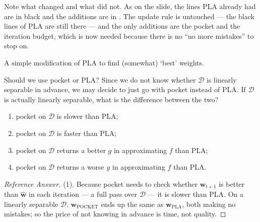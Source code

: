 \begin{algorithm}[H]
    \caption{Pocket Algorithm}\label{alg:pocket}
    \;
    \;
\end{algorithm}

Note what changed and what did not. As on the slide, the lines PLA already
had are in black and the additions are in . The update rule
is untouched --- the black lines of PLA are still there --- and the only
additions are the pocket and the iteration budget, which is now needed because
there is no ``no more mistakes'' to stop on.

\begin{moral}
    A simple modification of PLA to find (somewhat) `best' weights.
\end{moral}

\begin{exercise}
    Should we use pocket or PLA? Since we do not know whether \(\mathcal{D}\) is
    linearly separable in advance, we may decide to just go with pocket instead
    of PLA. If \(\mathcal{D}\) is actually linearly separable, what is the
    difference between the two?
    \begin{enumerate}[(1)]
        \item pocket on \(\mathcal{D}\) is slower than PLA;
        \item pocket on \(\mathcal{D}\) is faster than PLA;
        \item pocket on \(\mathcal{D}\) returns a better \(g\) in approximating
            \(f\) than PLA;
        \item pocket on \(\mathcal{D}\) returns a worse \(g\) in approximating
            \(f\) than PLA.
    \end{enumerate}
\end{exercise}

\begin{proof}[Reference Answer]
    (1). Because pocket needs to check whether \(\bm{w}_{t+1}\) is better than
    \(\hat{\bm{w}}\) in each iteration --- a full pass over \(\mathcal{D}\) ---
    it is slower than PLA. On a linearly separable \(\mathcal{D}\),
    \(\bm{w}_{\mathrm{POCKET}}\) ends up the same as \(\bm{w}_{\mathrm{PLA}}\),
    both making no mistakes; so the price of not knowing in advance is time, not
    quality.
\end{proof}

